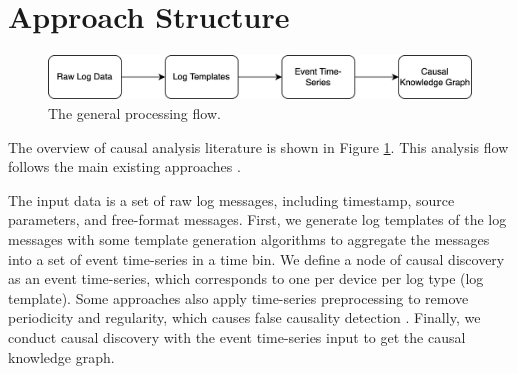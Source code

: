 \section{Approach Structure}
\label{sec:2}
\begin{figure}[h]
\centering
    \label{fig:structure}
    \includegraphics[width=\textwidth]{figures/structure.png}
    \caption{The general processing flow.}
\end{figure}
The overview of causal analysis literature is shown in Figure \hyperref[fig:structure]{1}. This analysis flow follows the main existing approaches \cite{jarry2021quantitative,jia2017approach,kobayashi2017mining,lou2010mining,otomo2019latent}.\newline

The input data is a set of raw log messages, including timestamp, source parameters, and free-format messages. First, we generate log templates of the log messages with some template generation algorithms to aggregate the messages into a set of event time-series in a time bin. We define a node of causal discovery as an event time-series, which corresponds to one per device per log type (log template). Some approaches also apply time-series preprocessing to remove periodicity and regularity, which causes false causality detection \cite{jarry2021quantitative,kobayashi2017mining}. Finally, we conduct causal discovery with the event time-series input to get the causal knowledge graph.